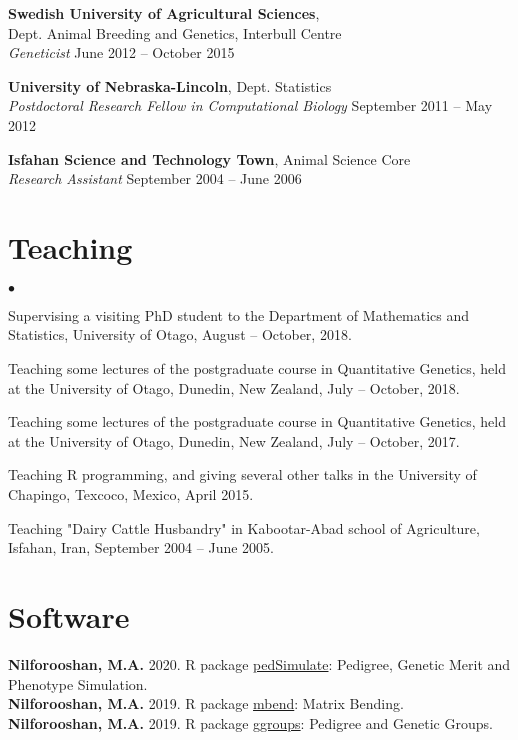 \documentclass[margin,line]{res}
\newenvironment{list2}{
  \begin{list}{$\bullet$}{%
      \setlength{\itemsep}{0in}
      \setlength{\parsep}{0in} \setlength{\parskip}{0in}
      \setlength{\topsep}{0in} \setlength{\partopsep}{0in}
      \setlength{\leftmargin}{0.2in}}}{\end{list}}
\begin{document}
\begin{resume}
{\bf Swedish University of Agricultural Sciences}, \\
Dept. Animal Breeding and Genetics, Interbull Centre \\
{\em Geneticist} \hfill{June 2012 -- October 2015}

{\bf University of Nebraska-Lincoln}, Dept. Statistics \\
{\em Postdoctoral Research Fellow in Computational Biology} \hfill{September 2011 -- May 2012}

{\bf Isfahan Science and Technology Town}, Animal Science Core \\
{\em Research Assistant} \hfill{September 2004 -- June 2006}
\section{\sc Teaching}

\begin{list2}
\item Supervising a visiting PhD student to the Department of Mathematics and Statistics, University of Otago, August -- October, 2018.
\item Teaching some lectures of the postgraduate course in Quantitative Genetics, held at the University of Otago, Dunedin, New Zealand, July -- October, 2018.
\item Teaching some lectures of the postgraduate course in Quantitative Genetics, held at the University of Otago, Dunedin, New Zealand, July -- October, 2017.
\item Teaching R programming, and giving several other talks in the University of Chapingo, Texcoco, Mexico, April 2015.
\item Teaching "Dairy Cattle Husbandry" in Kabootar-Abad school of Agriculture, Isfahan, Iran, September 2004 -- June 2005.
\end{list2}
\section{\sc Software}

{\bf Nilforooshan, M.A.} 2020. R package \href{https://CRAN.R-project.org/package=pedSimulate}{pedSimulate}: Pedigree, Genetic Merit and Phenotype Simulation. \\
{\bf Nilforooshan, M.A.} 2019. R package \href{https://CRAN.R-project.org/package=mbend}{mbend}: Matrix Bending. \\
{\bf Nilforooshan, M.A.} 2019. R package \href{https://CRAN.R-project.org/package=ggroups}{ggroups}: Pedigree and Genetic Groups.

\end{resume}
\end{document}
